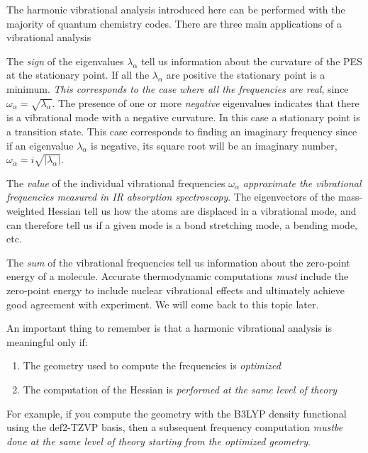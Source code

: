 \documentclass[../Main/chem371-notes.tex]{subfiles}
\begin{document}
The harmonic vibrational analysis introduced here can be performed with the majority of quantum chemistry codes.
There are three main applications of a vibrational analysis
\begin{myitems}
\item The \emph{sign} of the eigenvalues $\lambda_\alpha$ tell us information about the curvature of the PES at the stationary point.
If all the $\lambda_\alpha$ are positive the stationary point is a minimum. \emph{This corresponds to the case where all the frequencies are real}, since $\omega_\alpha = \sqrt{\lambda_\alpha}$.
The presence of one or more \emph{negative} eigenvalues indicates that there is a vibrational mode with a negative curvature.
In this case a stationary point is a transition state.
This case corresponds to finding an imaginary frequency since if an eigenvalue $\lambda_\alpha$ is negative, its square root will be an imaginary number, $\omega_\alpha = i \sqrt{|\lambda_\alpha|}$.

\item The \emph{value} of the individual vibrational frequencies $\omega_\alpha$ \emph{approximate the vibrational frequencies measured in IR absorption spectroscopy}.
The eigenvectors of the mass-weighted Hessian tell us how the atoms are displaced in a vibrational mode, and can therefore tell us if a given mode is a bond stretching mode, a bending mode, etc.

\item The \emph{sum} of the vibrational frequencies tell us information about the zero-point energy of a molecule.
Accurate thermodynamic computations \emph{must} include the zero-point energy to include nuclear vibrational effects and ultimately achieve good agreement with experiment. We will come back to this topic later.
\end{myitems}

\begin{ibox}
An important thing to remember is that a harmonic vibrational analysis is meaningful only if:
\begin{enumerate}
\item The geometry used to compute the frequencies is \emph{optimized}
\item The computation of the Hessian is \emph{performed at the same level of theory}
\end{enumerate}
For example, if you compute the geometry with the B3LYP density functional using the def2-TZVP basis, then a subsequent frequency computation \emph{mustbe done at the same level of theory starting from the optimized geometry}.
\end{ibox}
\end{document}
